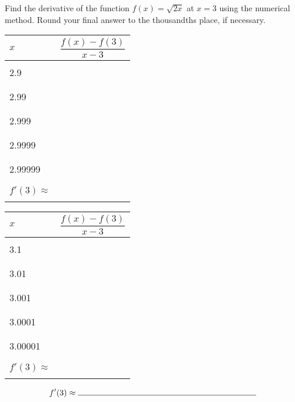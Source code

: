 \documentclass[notes]{subfiles}
\begin{document}
		\begin{ex} Find the derivative of the function $f(x) = \sqrt{2x}$ at $x = 3$ using the numerical method.  Round your final answer to the thousandths place, if necessary.\\
		\begin{center}
				\begin{minipage}{.45\textwidth}
					\tabulinesep=1mm
					\begin{tabu}{|X[c]|X[1.5,c]|}\hline
						$x$ 		& $\dfrac{f(x) - f(3)}{x-3}$ \\ \hline
								& \\
						2.9		& \\ 
								& \\ \hline
								& \\
						2.99	& \\
								& \\ \hline 
								& \\
						2.999	& \\ 
								& \\ \hline
								& \\ 
						2.9999	& \\ 
								& \\ \hline
								& \\
						2.99999	&\\
								&\\ \hline\hline
								&\\
						$f'(3)\approx$ & \\
								&\\ \hline
					\end{tabu}
				\end{minipage}
				\begin{minipage}{.45\textwidth}
					\tabulinesep=1mm
					\begin{tabu}{|X[c]|X[1.5,c]|}\hline
						$x$ 		& $\dfrac{f(x) - f(3)}{x-3}$ \\ \hline
								& \\
						3.1		& \\ 
								& \\ \hline
								& \\
						3.01	& \\
								& \\ \hline 
								& \\
						3.001	& \\ 
								& \\ \hline
								& \\ 
						3.0001	& \\ 
								& \\ \hline
								& \\
						3.00001	&\\
								&\\ \hline\hline
								&\\
						$f'(3)\approx$ & \\
								&\\ \hline
					\end{tabu}
				\end{minipage}
				\[f'(3)\approx \makebox[3in]{\hrulefill}\]
					
			\end{center}					
		\end{ex}	
\end{document}
